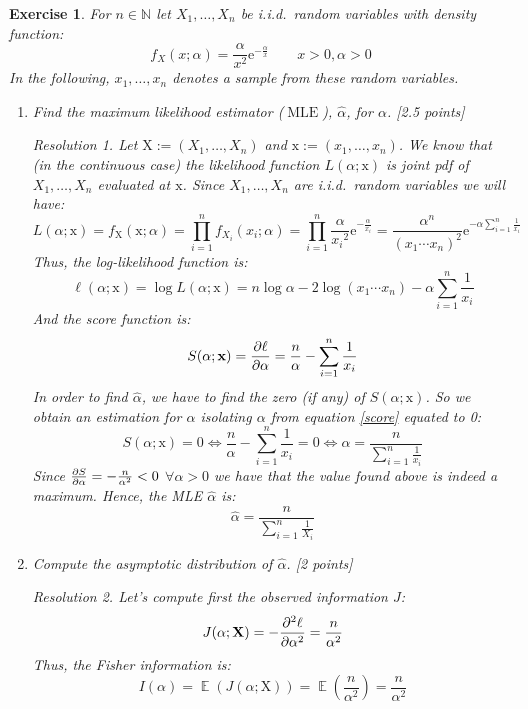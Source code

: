 \documentclass[10pt,a4paper]{article}
\newcommand{\vf}[1]{\boldsymbol{\mathrm{#1}}} %
\newcommand{\NN}{\ensuremath{\mathbb{N}}}
\theoremstyle{plain}
\newtheorem{exercice}{Exercise}
\theoremstyle{remark}
\newtheorem*{resolution}{Resolution}
\DeclareMathOperator{\MLE}{MLE} %
\DeclareMathOperator{\Exp}{\mathbb{E}} %
\renewcommand{\exp}[1]{\mathrm{e}^{#1}} %
\newcommand{\iid}{i.i.d.\ } %
\begin{document}
\begin{exercice}
  For $n\in\NN$ let $X_1,\ldots,X_n$ be \iid random variables with density function: $$f_X(x;\alpha)=\frac{\alpha}{x^2}\exp{-\frac{\alpha}{x}}\qquad x>0,\alpha>0$$
  In the following, $x_1,\ldots,x_n$ denotes a sample from these random variables.
  \begin{enumerate}
    \item Find the maximum likelihood estimator ($\MLE$), $\hat{\alpha}$, for $\alpha$. [2.5 points]
          \begin{resolution}
            Let $\vf{X}:=(X_1,\ldots,X_n)$ and $\vf{x}:=(x_1,\ldots,x_n)$. We know that (in the continuous case) the likelihood function $L(\alpha;\vf{x})$ is joint pdf of $X_1,\ldots,X_n$ evaluated at $\vf{x}$. Since $X_1,\ldots,X_n$ are \iid random variables we will have: $$L(\alpha;\vf{x})=f_{\vf{X}}(\vf{x};\alpha)=\prod_{i=1}^nf_{X_i}(x_i;\alpha)=\prod_{i=1}^n\frac{\alpha}{{x_i}^2}\exp{-\frac{\alpha}{x_i}}=\frac{\alpha^n}{{\left(x_1\cdots x_n\right)}^2}\exp{-\alpha\sum_{i=1}^n\frac{1}{x_i}}$$
            Thus, the log-likelihood function is:
            $$\ell(\alpha;\vf{x})=\log L(\alpha;\vf{x})=n\log\alpha-2\log(x_1\cdots x_n)-\alpha\sum_{i=1}^n\frac{1}{x_i}$$
            And the score function is:
            \begin{equation}\label{score}
              S(\alpha;\vf{x})=\pdv{\ell}{\alpha}(\alpha;\vf{x})=\frac{n}{\alpha}-\sum_{i=1}^n\frac{1}{x_i}
            \end{equation}
            In order to find $\hat\alpha$, we have to find the zero (if any) of $S(\alpha;\vf{x})$. So we obtain an estimation for $\alpha$ isolating $\alpha$ from equation \eqref{score} equated to 0:
            $$S(\alpha;\vf{x})=0\iff\frac{n}{\alpha}-\sum_{i=1}^n\frac{1}{x_i}=0\iff\alpha=\frac{n}{\sum_{i=1}^n\frac{1}{x_i}}$$
            Since $\pdv{S}{\alpha}(\alpha;\vf{x})=-\frac{n}{\alpha^2}<0$ $\forall \alpha>0$ we have that the value found above is indeed a maximum. Hence, the MLE $\hat\alpha$ is: $$\hat\alpha=\frac{n}{\sum_{i=1}^n\frac{1}{X_i}}$$
          \end{resolution}
    \item Compute the asymptotic distribution of $\hat\alpha$. [2 points]
          \begin{resolution}
            Let's compute first the observed information $J$:
            $$J(\alpha;\vf{X})=-\pdv[2]{\ell}{\alpha}(\alpha;\vf{X})=\frac{n}{\alpha^2}$$
            Thus, the Fisher information is: $$I(\alpha)=\Exp(J(\alpha;\vf{X}))=\Exp\left(\frac{n}{\alpha^2}\right)=\frac{n}{\alpha^2}$$

\end{resolution}
\end{enumerate}
\end{exercice}
\end{document}
